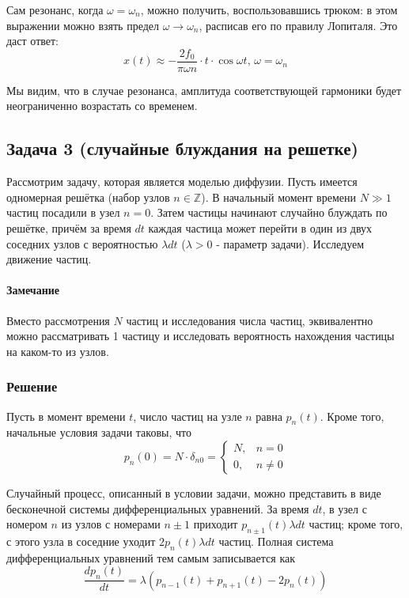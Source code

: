 \documentclass[a4paper,12pt]{article}
\begin{document}
\noindent
Сам резонанс, когда $\omega=\omega_{n}$, можно получить, воспользовавшись
трюком: в этом выражении можно взять предел $\omega\to\omega_{n}$,
расписав его по правилу Лопиталя. Это даст ответ:
\[
x(t)\approx-\frac{2f_{0}}{\pi\omega n}\cdot t\cdot\cos\omega t,\,\omega=\omega_{n}
\]


\noindent
Мы видим, что в случае резонанса, амплитуда соответствующей гармоники
будет неограниченно возрастать со временем.


\subsection*{Задача 3 (случайные блуждания на решетке)}

Рассмотрим задачу, которая является моделью диффузии. Пусть имеется
одномерная решётка (набор узлов $n\in\mathbb{Z}$). В начальный момент
времени $N\gg1$ частиц посадили в узел $n=0$. Затем частицы начинают
случайно блуждать по решётке, причём за время $dt$ каждая частица
может перейти в один из двух соседних узлов с вероятностью $\lambda dt$
($\lambda>0$ - параметр задачи). Исследуем движение частиц.


\paragraph{Замечание}

Вместо рассмотрения $N$ частиц и исследования числа частиц, эквивалентно
можно рассматривать 1 частицу и исследовать вероятность нахождения
частицы на каком-то из узлов.


\subsubsection*{Решение}

Пусть в момент времени $t$, число частиц на узле $n$ равна $p_{n}\left(t\right)$.
Кроме того, начальные условия задачи таковы, что 
\[
p_{n}(0)=N\cdot\delta_{n0}=\begin{cases}
N, & n=0\\
0, & n\neq0
\end{cases}
\]


\noindent
Случайный процесс, описанный в условии задачи, можно представить в
виде бесконечной системы дифференциальных уравнений. За время $dt$,
в узел с номером $n$ из узлов с номерами $n\pm1$ приходит $p_{n\pm1}(t)\lambda dt$
частиц; кроме того, с этого узла в соседние уходит $2p_{n}(t)\lambda dt$
частиц. Полная система дифференциальных уравнений тем самым записывается
как
\[
\frac{dp_{n}(t)}{dt}=\lambda(p_{n-1}(t)+p_{n+1}(t)-2p_{n}(t))
\]
\end{document}
